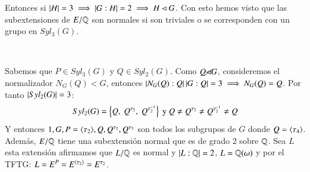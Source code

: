 \begin{eg}
\begin{enumerate}
        Entonces si $\left|H\right| = 3 \implies \left|G:H\right| = 2 \implies H \lhd G$. Con esto hemos visto que las subextensiones de $E/\mathbb{Q}$ son normales si son triviales o se corresponden con un grupo en $Syl_3(G)$.
        \begin{center}
            \\
        \end{center}
        Sabemos que $P \in Syl_3(G)$ y $Q \in Syl_2(G)$. Como $Q \cancel {\lhd} G$, consideremos el normalizador $N_G(Q) < G$, entonces $\left|N_G(Q):Q\right|\left|G:Q\right| = 3 \implies N_G(Q) = Q$. Por tanto $\left|Syl_2(G)\right| = 3$:
        $$
            Syl_2(G) = \left\{Q,\ Q^{\tau_2},\ Q^{\tau_2^{-1}}\right\} \text{ y } Q \neq Q^{\tau_2} \neq Q^{\tau_2^{-1}} \neq Q
        $$
        Y entonces $1, G, P=\langle\tau_2\rangle, Q, Q^{\tau_2}, Q^{\tau_3}$ son todos los subgrupos de $G$ donde $Q = \langle\tau_4\rangle$. Además, $E/\mathbb{Q}$ tiene una subextensión normal que es de grado $2$ sobre $\mathbb{Q}$. Sea $L$ esta extensión afirmamos que $L/\mathbb{Q}$ es normal y $\left|L:\mathbb{Q}\right| = 2$, $L=\mathbb{Q}(\omega)$ y por el TFTG: $L = E^{P} = E^{\langle\tau_2\rangle} = E^{\tau_2}$.


\end{enumerate}
\end{eg}
